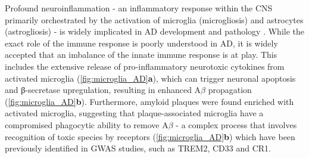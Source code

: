 \newpage
{}
Profound neuroinflammation - an inflammatory response within the CNS primarily orchestrated by the activation of microglia (microgliosis) and astrocytes (astrogliosis) - is widely implicated in AD development and pathology \cite{Cisbani2021,Griciuc2021}. While the exact role of the immune response is poorly understood in AD, it is widely accepted that an imbalance of the innate immune response is at play. This includes the extensive release of pro-inflammatory neurotoxic cytokines from activated microglia\cite{Frost2019} (\cref{fig:microglia_AD}\textbf{a}), which can trigger neuronal apoptosis\cite{Qin2002,Wang2015b} and β-secretase upregulation\cite{Chen2012}, resulting in enhanced A$\beta$ propagation (\cref{fig:microglia_AD}\textbf{b}). Furthermore, amyloid plaques were found enriched with activated microglia\cite{PL1987}, suggesting that plaque-associated microglia have a compromised phagocytic ability to remove A$\beta$\cite{Mawuenyega2010} - a complex process that involves recognition of toxic species by receptors (\cref{fig:microglia_AD}\textbf{b}) which have been previously identified in GWAS studies, such as TREM2, CD33 and CR1. 

